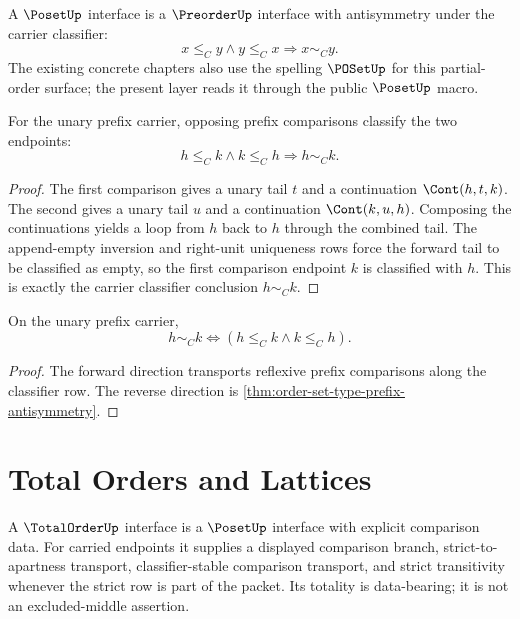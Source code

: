 \begin{definition}
\label{def:order-set-type-poset}
A $\PosetUp$ interface is a $\PreorderUp$ interface with antisymmetry under
the carrier classifier:
$$
x\le_C y\wedge y\le_C x\Longrightarrow x\sim_C y.
$$
The existing concrete chapters also use the spelling $\POSetUp$ for this
partial-order surface; the present layer reads it through the public
$\PosetUp$ macro.
\end{definition}

\begin{theorem}
\label{thm:order-set-type-prefix-antisymmetry}
For the unary prefix carrier, opposing prefix comparisons classify the two
endpoints:
$$
h\le_C k\wedge k\le_C h\Longrightarrow h\sim_C k.
$$
\end{theorem}

\begin{proof}
The first comparison gives a unary tail $t$ and a continuation
$\Cont(h,t,k)$.  The second gives a unary tail $u$ and a continuation
$\Cont(k,u,h)$.  Composing the continuations yields a loop from $h$ back to
$h$ through the combined tail.  The append-empty inversion and right-unit
uniqueness rows force the forward tail to be classified as empty, so the
first comparison endpoint $k$ is classified with $h$.  This is exactly the
carrier classifier conclusion $h\sim_C k$.
\end{proof}

\begin{corollary}
\label{cor:order-set-type-poset-exactness}
On the unary prefix carrier,
$$
h\sim_C k
\Longleftrightarrow
(h\le_C k\wedge k\le_C h).
$$
\end{corollary}

\begin{proof}
The forward direction transports reflexive prefix comparisons along the
classifier row.  The reverse direction is
\autoref{thm:order-set-type-prefix-antisymmetry}.
\end{proof}

\section{Total Orders and Lattices}
\label{sec:order-set-type-totalorder-lattice}

\begin{definition}
\label{def:order-set-type-totalorder}
A $\TotalOrderUp$ interface is a $\PosetUp$ interface with explicit
comparison data.  For carried endpoints it supplies a displayed comparison
branch, strict-to-apartness transport, classifier-stable comparison
transport, and strict transitivity whenever the strict row is part of the
packet.  Its totality is data-bearing; it is not an excluded-middle
assertion.
\end{definition}

